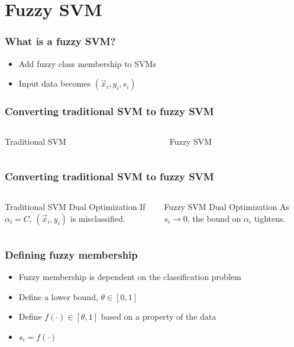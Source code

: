\section{Fuzzy SVM}

\begin{frame}
    \frametitle{What is a fuzzy SVM?}
    \begin{itemize}
        \item Add fuzzy class membership to SVMs \cite{991432}
        \item Input data becomes \(\left(\vec{x}_i, y_i, s_i\right)\)
    \end{itemize}
\end{frame}

\begin{frame}
    \frametitle{Converting traditional SVM to fuzzy SVM}
    \begin{columns}[T]
        \begin{column}{0.5\textwidth}
            Traditional SVM
            \svmEquation
        \end{column}
        \begin{column}{0.5\textwidth}
            Fuzzy SVM
            \fuzzySvmEquation
        \end{column}
    \end{columns}
\end{frame}

\begin{frame}
    \frametitle{Converting traditional SVM to fuzzy SVM}
    \begin{columns}[T]
        \begin{column}{0.5\textwidth}
            Traditional SVM Dual Optimization
            \traditionalDual
            If \(\alpha_i = C\), \(\left(\vec{x}_i, y_i\right)\) is misclassified.
        \end{column}
        \begin{column}{0.5\textwidth}
            Fuzzy SVM Dual Optimization
            \fuzzyDual
            As \(s_i \to 0\), the bound on \(\alpha_i\) tightens.
        \end{column}
    \end{columns}
\end{frame}

\begin{frame}
    \frametitle{Defining fuzzy membership}
    \begin{itemize}
        \item Fuzzy membership is dependent on the classification problem
        \item Define a lower bound, \(\theta \in [0, 1]\)
        \item Define \(f(\cdot) \in [\theta, 1]\) based on a property of the data
        \item \(s_i = f(\cdot)\)
    \end{itemize}
\end{frame}
